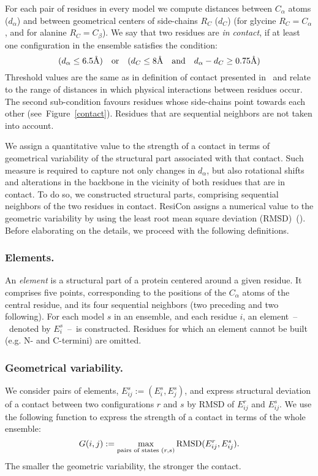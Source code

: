 \documentclass[a4paper,11pt,twoside]{book}%
\begin{document}
For each pair of residues in every model we compute distances between $C_\alpha$ atoms ($d_\alpha$) and between geometrical centers of side-chains $R_C$ ($d_C$) (for glycine $R_C = C_\alpha$, and for alanine $R_C = C_\beta$).
We say that two residues are \emph{in contact}, if at least one configuration in the ensemble satisfies the condition:
\begin{equation}
(d_\alpha \leq 6.5\mbox{\normalfont\AA})\quad \text{or} \quad (d_C \leq 8\mbox{\normalfont\AA}\quad \text{and} \quad d_\alpha - d_C \geq 0.75\mbox{\normalfont\AA})
\label{condition}
\end{equation}
Threshold values are the same as in definition of contact presented in~\cite{daniluk2011novel} and relate to the range of distances in which physical interactions between residues occur.
The second sub-condition favours residues whose side-chains point towards each other (see~Figure~\ref{contact}). 
Residues that are sequential neighbors are not taken into account.

We assign a quantitative value to the strength of a contact in terms of geometrical variability of the structural part associated with that contact.
Such measure is required to capture not only changes in $d_\alpha$, but also rotational shifts and alterations in the backbone in the vicinity of both residues that are in contact.
To do so, we constructed structural parts, comprising sequential neighbors of the two residues in contact.
ResiCon assigns a numerical value to the geometric variability by using the least root mean square deviation (RMSD)~(\cite{kabsch1976solution}).
Before elaborating on the details, we proceed with the following definitions.

\subsubsection*{Elements.}
An \emph{element} is a structural part of a protein centered around a given residue.
It comprises five points, corresponding to the positions of the $C_\alpha$ atoms of the central residue, and its four sequential neighbors (two preceding and two following).
For each model $s$ in an ensemble, and each residue $i$, an element~--~denoted by $E_i^s$~--~is constructed.
Residues for which an element cannot be built (e.g. N- and C-termini) are omitted.

\subsubsection*{Geometrical variability.}
We consider pairs of elements, $E_{ij}^s := ( E_i^s , E_j^s )$, and express structural deviation of a contact between two configurations $r$ and $s$ by RMSD of $E_{ij}^r$ and $E_{ij}^s$.
We use the following function to express the strength of a contact in terms of the whole ensemble:
\begin{displaymath}
G(i,j) := \max_{\text{pairs of states }\\(r,s)} \text{RMSD}(E_{ij}^r,E_{ij}^s) .
\end{displaymath}
The smaller the geometric variability, the stronger the contact.
\end{document}
